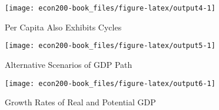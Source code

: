 \documentclass[
]{book}
\begin{document}
\begin{figure}

{\centering \texttt{[image: econ200-book\_files/figure-latex/output4-1]} 

}

\caption{Per Capita Also Exhibits Cycles}\label{fig:output4}
\end{figure}

\begin{figure}

{\centering \texttt{[image: econ200-book\_files/figure-latex/output5-1]} 

}

\caption{Alternative Scenarios of GDP Path}\label{fig:output5}
\end{figure}

\begin{figure}

{\centering \texttt{[image: econ200-book\_files/figure-latex/output6-1]} 

}

\caption{Growth Rates of Real and Potential GDP}\label{fig:output6}
\end{figure}

  
\end{document}
